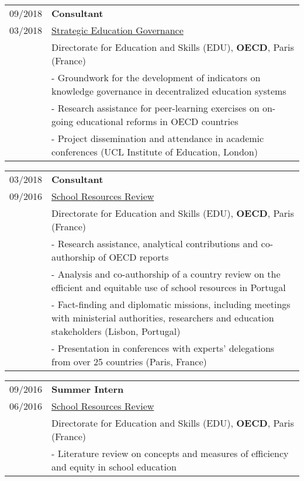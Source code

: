 \documentclass[a4paper,11pt]{article} %
\begin{document}
\begin{tabular}{r|p{13cm}}
	09/2018 & \textbf{Consultant} \\
	03/2018 & \href{http://www.oecd.org/education/ceri/strategic-education-governance.htm}{Strategic Education Governance} \\
	& Directorate for Education and Skills (EDU), \textbf{OECD}, Paris (France) \\
	& - Groundwork for the development of indicators on knowledge governance in decentralized education systems \\
	& - Research assistance for peer-learning exercises on on-going educational reforms in OECD countries \\
	& - Project dissemination and attendance in academic conferences (UCL Institute of Education, London)\\
\end{tabular}

\begin{tabular}{r|p{13cm}}
	03/2018 & \textbf{Consultant} \\
	09/2016 & \href{http://www.oecd.org/education/school-resources-review/}{School Resources Review} \\
	& Directorate for Education and Skills (EDU), \textbf{OECD}, Paris (France) \\
	& - Research assistance, analytical contributions and co-authorship of OECD reports \\
	& - Analysis and co-authorship of a country review on the efficient and equitable use of school resources in Portugal \\
	& - Fact-finding and diplomatic missions, including meetings with ministerial authorities, researchers and education stakeholders (Lisbon, Portugal) \\
	& - Presentation in conferences with experts' delegations from over 25 countries (Paris, France) \\
\end{tabular}

\begin{tabular}{r|p{13cm}}
	09/2016 & \textbf{Summer Intern} \\
	06/2016 & \href{http://www.oecd.org/education/school-resources-review/}{School Resources Review} \\
	& Directorate for Education and Skills (EDU), \textbf{OECD}, Paris (France) \\
	& - Literature review on concepts and measures of efficiency and equity in school education \\
\end{tabular}
\end{document}
